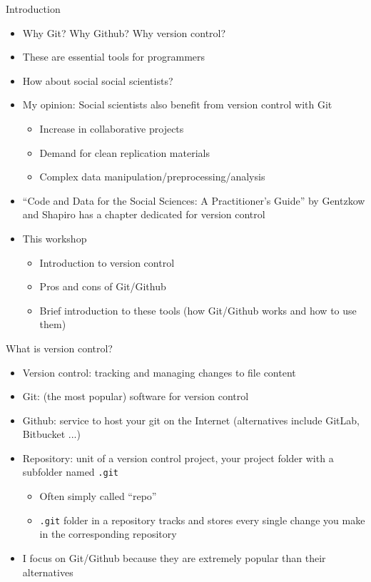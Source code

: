 \documentclass[handout,pdftex,10pt,aspectratio=169]{beamer}
\begin{document}
\begin{frame}{Introduction}
  \begin{itemize}[<+->]  \setlength\itemsep{-3pt}
    \item Why Git? Why Github? Why version control?
    \item These are essential tools for programmers
    \item How about social social scientists?
    \item My opinion: Social scientists also benefit from version control with Git \vspace{-5pt}
    \begin{itemize} \setlength\itemsep{-5pt}
      \item Increase in collaborative projects
      \item Demand for clean replication materials
      \item Complex data manipulation/preprocessing/analysis
    \end{itemize}
    \item ``Code and Data for the Social Sciences: A Practitioner's Guide''
    by Gentzkow and Shapiro has a chapter dedicated for version control
    \medskip
    \item This workshop \vspace{-5pt}
    \begin{itemize} \setlength\itemsep{-5pt}
      \item Introduction to version control
      \item Pros and cons of Git/Github
      \item Brief introduction to these tools (how Git/Github works and how to use them)
    \end{itemize}
  \end{itemize}
\end{frame}


\begin{frame}{What is version control?}
  \begin{itemize}[<+->]
    \item Version control: tracking and managing changes to file content
    \item Git: (the most popular) software for version control
    \item Github: service to host your git on the Internet
    (alternatives include GitLab, Bitbucket ...)
    \item Repository: unit of a version control project,
    your project folder with a subfolder named \texttt{.git}
    \begin{itemize}
      \item Often simply called ``repo''
      \item \texttt{.git} folder in a repository tracks and stores every single change you make in the corresponding repository
    \end{itemize}
    \medskip
    \item I focus on Git/Github  because they are extremely popular
    than their alternatives
  \end{itemize}
\end{frame}
\end{document}
